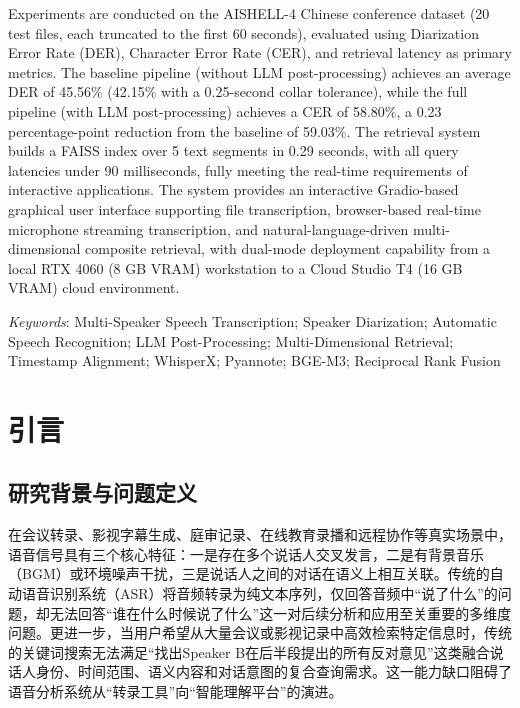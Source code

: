\documentclass[12pt, a4paper]{article}
\newcommand{\keywordsEN}[1]{\noindent\textit{Keywords}: #1}
\begin{document}
Experiments are conducted on the AISHELL-4 Chinese conference dataset (20 test files, each truncated to the first 60 seconds), evaluated using Diarization Error Rate (DER), Character Error Rate (CER), and retrieval latency as primary metrics. The baseline pipeline (without LLM post-processing) achieves an average DER of 45.56\% (42.15\% with a 0.25-second collar tolerance), while the full pipeline (with LLM post-processing) achieves a CER of 58.80\%, a 0.23 percentage-point reduction from the baseline of 59.03\%. The retrieval system builds a FAISS index over 5 text segments in 0.29 seconds, with all query latencies under 90 milliseconds, fully meeting the real-time requirements of interactive applications. The system provides an interactive Gradio-based graphical user interface supporting file transcription, browser-based real-time microphone streaming transcription, and natural-language-driven multi-dimensional composite retrieval, with dual-mode deployment capability from a local RTX 4060 (8 GB VRAM) workstation to a Cloud Studio T4 (16 GB VRAM) cloud environment.

\vspace{12pt}
\keywordsEN{Multi-Speaker Speech Transcription; Speaker Diarization; Automatic Speech Recognition; LLM Post-Processing; Multi-Dimensional Retrieval; Timestamp Alignment; WhisperX; Pyannote; BGE-M3; Reciprocal Rank Fusion}

\newpage

\section{引言}

\subsection{研究背景与问题定义}

在会议转录、影视字幕生成、庭审记录、在线教育录播和远程协作等真实场景中，语音信号具有三个核心特征：一是存在多个说话人交叉发言，二是有背景音乐（BGM）或环境噪声干扰，三是说话人之间的对话在语义上相互关联。传统的自动语音识别系统（ASR）将音频转录为纯文本序列，仅回答音频中``说了什么''的问题，却无法回答``谁在什么时候说了什么''这一对后续分析和应用至关重要的多维度问题\cite{radford2022whisper}。更进一步，当用户希望从大量会议或影视记录中高效检索特定信息时，传统的关键词搜索无法满足``找出Speaker B在后半段提出的所有反对意见''这类融合说话人身份、时间范围、语义内容和对话意图的复合查询需求。这一能力缺口阻碍了语音分析系统从``转录工具''向``智能理解平台''的演进。
\end{document}
